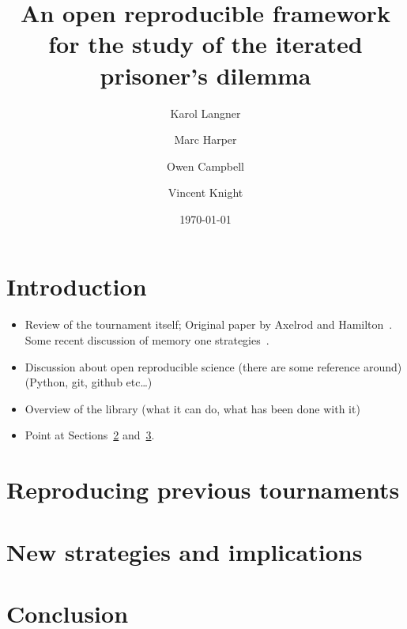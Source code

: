 \documentclass{article}
\title{An open reproducible framework for the study of the iterated prisoner's
dilemma}
\author{Karol Langner\\
        \and
        Marc Harper\\
        \and
        Owen Campbell\\
        \and
        Vincent Knight\\
}
\date{\today}
\begin{document}
\maketitle

\section{Introduction}\label{sec:introduction}

\begin{itemize}
\item Review of the tournament itself;
      Original paper by Axelrod and Hamilton~\cite{1981-Axelrod-Hamilton}.
      Some recent discussion of memory one strategies~\cite{press2012iterated, stewart2012extortion}.

\item Discussion about open reproducible science (there are some reference
      around) (Python, git, github etc\dots)
\item Overview of the library (what it can do, what has been done with it)
\item Point at Sections~\ref{sec:reproducing-previous-tournaments}
      and~\ref{sec:new-strategies-and-implications}.
\end{itemize}

\section{Reproducing previous tournaments}\label{sec:reproducing-previous-tournaments}

\section{New strategies and implications}\label{sec:new-strategies-and-implications}

\section{Conclusion}\label{sec:conclusion}

\printbibliography
\end{document}
